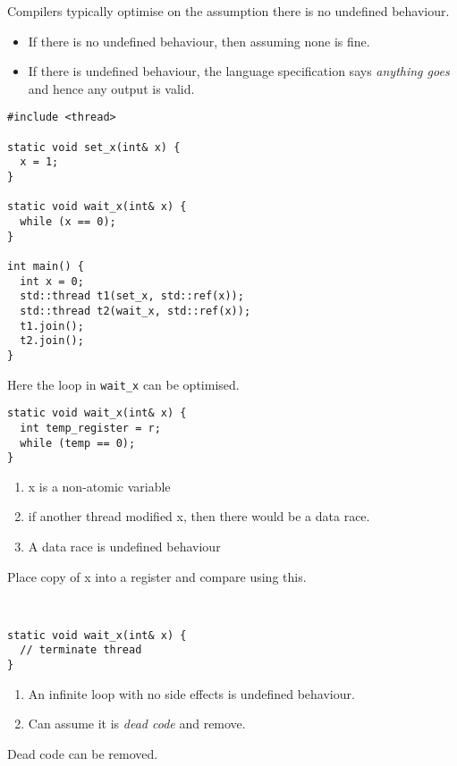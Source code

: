 Compilers typically optimise on the assumption there is no undefined behaviour. 
\begin{itemize}
  \item If there is no undefined behaviour, then assuming none is fine.
  \item If there is undefined behaviour, the language specification says \textit{anything goes} and hence any output is valid.
\end{itemize}

\begin{verbatim}
#include <thread>

static void set_x(int& x) {
  x = 1;
}

static void wait_x(int& x) {
  while (x == 0);
}

int main() {
  int x = 0;
  std::thread t1(set_x, std::ref(x));
  std::thread t2(wait_x, std::ref(x));
  t1.join();
  t2.join();
}
\end{verbatim}
Here the loop in \texttt{wait_x} can be optimised.
\\\begin{minipage}{.5\textwidth}
  \begin{verbatim}
static void wait_x(int& x) {
  int temp_register = r; 
  while (temp == 0);
}
  \end{verbatim}
\end{minipage}
\hfill
\begin{minipage}{.48\textwidth}
  \begin{enumerate}
    \item x is a non-atomic variable
    \item if another thread modified x, then there would be a data race.
    \item A data race is undefined behaviour
  \end{enumerate}
  Place copy of x into a register and compare using this.
\end{minipage}
\\\begin{minipage}{.5\textwidth}
  \begin{verbatim}
static void wait_x(int& x) {
  // terminate thread
}
  \end{verbatim}
\end{minipage}
\hfill
\begin{minipage}{.48\textwidth}
  \begin{enumerate}
    \item An infinite loop with no side effects is undefined behaviour.
    \item Can assume it is \textit{dead code} and remove.
  \end{enumerate}
  Dead code can be removed.
\end{minipage}

